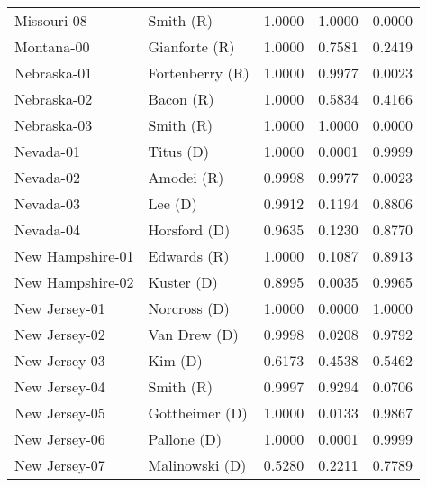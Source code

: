 \begin{longtable}{llrll}
       Missouri-08 &            {\color{Red} Smith (R)} &       1.0000 &        1.0000 &        0.0000 \\
        Montana-00 &        {\color{Red} Gianforte (R)} &       1.0000 &        0.7581 &        0.2419 \\
       Nebraska-01 &      {\color{Red} Fortenberry (R)} &       1.0000 &        0.9977 &        0.0023 \\
       Nebraska-02 &            {\color{Red} Bacon (R)} &       1.0000 &        0.5834 &        0.4166 \\
       Nebraska-03 &            {\color{Red} Smith (R)} &       1.0000 &        1.0000 &        0.0000 \\
         Nevada-01 &           {\color{Blue} Titus (D)} &       1.0000 &        0.0001 &        0.9999 \\
         Nevada-02 &           {\color{Red} Amodei (R)} &       0.9998 &        0.9977 &        0.0023 \\
         Nevada-03 &             {\color{Blue} Lee (D)} &       0.9912 &        0.1194 &        0.8806 \\
         Nevada-04 &        {\color{Blue} Horsford (D)} &       0.9635 &        0.1230 &        0.8770 \\
  New Hampshire-01 &          {\color{Red} Edwards (R)} &       1.0000 &        0.1087 &        0.8913 \\
  New Hampshire-02 &          {\color{Blue} Kuster (D)} &       0.8995 &        0.0035 &        0.9965 \\
     New Jersey-01 &        {\color{Blue} Norcross (D)} &       1.0000 &        0.0000 &        1.0000 \\
     New Jersey-02 &        {\color{Blue} Van Drew (D)} &       0.9998 &        0.0208 &        0.9792 \\
     New Jersey-03 &             {\color{Blue} Kim (D)} &       0.6173 &        0.4538 &        0.5462 \\
     New Jersey-04 &            {\color{Red} Smith (R)} &       0.9997 &        0.9294 &        0.0706 \\
     New Jersey-05 &      {\color{Blue} Gottheimer (D)} &       1.0000 &        0.0133 &        0.9867 \\
     New Jersey-06 &         {\color{Blue} Pallone (D)} &       1.0000 &        0.0001 &        0.9999 \\
     New Jersey-07 &      {\color{Blue} Malinowski (D)} &       0.5280 &        0.2211 &        0.7789 \\

\end{longtable}
